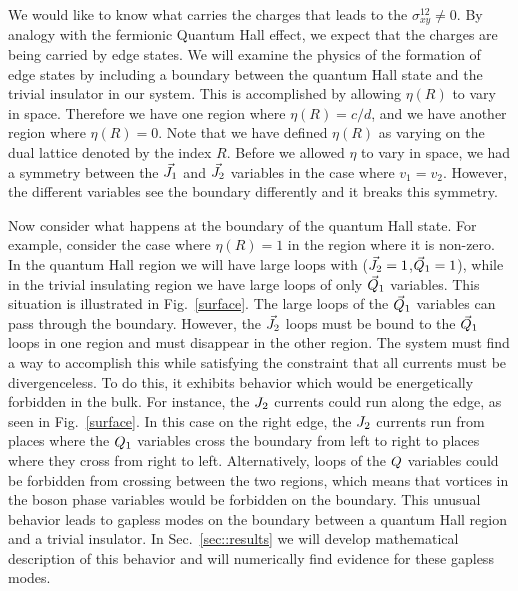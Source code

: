 We would like to know what carries the charges that leads to the $\sigma^{12}_{xy}\neq 0$. By analogy with the fermionic Quantum Hall effect, we expect that the charges are being carried by edge states. We will examine the physics of the formation of edge states by including a boundary between the quantum Hall state and the trivial insulator in our system.
This is accomplished by allowing $\eta(R)$ to vary in space. Therefore we have one region where $\eta(R)=c/d$, and we have another region where $\eta(R)=0$.  Note that we have defined $\eta(R)$ as varying on the dual lattice denoted by the index $R$. Before we allowed $\eta$ to vary in space, we had a symmetry between the $\vec{J}_1$ and $\vec{J}_2$ variables in the case where $v_1=v_2$. However, the different variables see the boundary differently and it  breaks this symmetry.

Now consider what happens at the boundary of the quantum Hall state. For example, consider the case where $\eta(R)=1$ in the region where it is non-zero. In the quantum Hall region we will have large loops with ($\vec{J}_2=1$,$\vec{Q}_1=1$), while in the trivial insulating region we have large loops of only $\vec{Q}_1$ variables. This situation is illustrated in Fig.~\ref{surface}. The large loops of the $\vec{Q}_1$ variables can pass through the boundary. However, the $\vec{J}_2$ loops must be bound to the $\vec{Q}_1$ loops in one region and must disappear in the other region. The system must find a way to accomplish this while satisfying the constraint that all currents must be divergenceless. 
To do this, it exhibits behavior which would be energetically forbidden in the bulk. For instance, the $J_2$ currents could run along the edge, as seen in Fig.~\ref{surface}. In this case on the right edge, the $J_2$ currents run from places where the $Q_1$ variables cross the boundary from left to right to places where they cross from right to left. Alternatively, loops of the $Q$ variables could be forbidden from crossing between the two regions, which means that vortices in the boson phase variables would be forbidden on the boundary. This unusual behavior leads to gapless modes on the boundary between a quantum Hall region and a trivial insulator. In Sec.~\ref{sec::results} we will develop mathematical description of this behavior and will numerically find evidence for these gapless modes.


